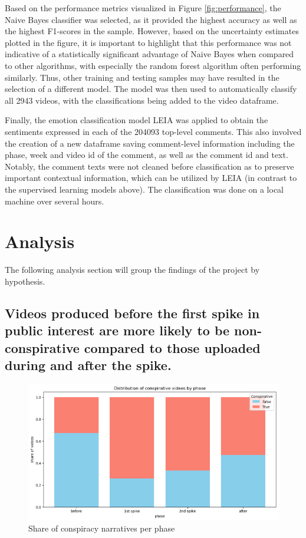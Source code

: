 \documentclass[fontsize=11pt, parskip=half]{scrartcl}
\begin{document}
    Based on the performance metrics visualized in Figure \ref{fig:performance}, the Naive Bayes classifier was selected, as it provided the highest accuracy as well as the highest F1-scores in the sample. However, based on the uncertainty estimates plotted in the figure, it is important to highlight that this performance was not indicative of a statistically significant advantage of Naive Bayes when compared to other algorithms, with especially the random forest algorithm often performing similarly. Thus, other training and testing samples may have resulted in the selection of a different model. The model was then used to automatically classify all 2943 videos, with the classifications being added to the video dataframe. 

    Finally, the emotion classification model LEIA was applied to obtain the sentiments expressed in each of the 204093 top-level comments. This also involved the creation of a new dataframe saving comment-level information including the phase, week and video id of the comment, as well as the comment id and text. Notably, the comment texts were not cleaned before classification as to preserve important contextual information, which can be utilized by LEIA (in contrast to the supervised learning models above). The classification was done on a local machine over several hours.
    
\section{Analysis}
\label{section:analysis}

    The following analysis section will group the findings of the project by hypothesis.

    \subsection{Videos produced before the first spike in public interest are more likely to be non-conspirative compared to those uploaded during and after the spike.}

    \begin{figure}
        \centering
        \vspace{-20pt}
        \setlength\intextsep{0pt}
        \includegraphics[width=0.58 \textwidth]{img/conspirative_phase.png}
        \vspace{-5pt}
        \caption{Share of conspiracy narratives per phase}
        \vspace{-10pt}
        \label{fig:conspiracy_phase}
    \end{figure}
\end{document}
